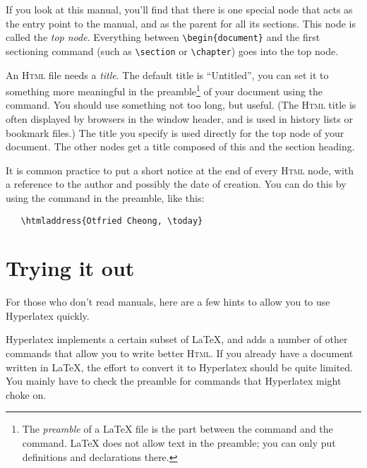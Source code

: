 \documentclass{article}
\newcommand{\+}{\verb+}
\renewcommand{\*}{\back{}}
\newcommand{\Html}{\textsc{Html}\xspace }
\newcommand{\latex}{\LaTeX\xspace }
\begin{document}
\label{topnode}
If you look at \texonly{the \Html output for} this manual, you'll find
that there is one special node that acts as the entry point to the
manual, and as the parent for all its sections. This node is called
the \emph{top node}.  Everything between \+\begin{document}+ and the
  first sectioning command (such as \+\section+ or \+\chapter+) goes
  into the top node.
  
\label{htmltitle}
\label{preamble}
An \Html file needs a \emph{title}. The default title is ``Untitled'',
you can set it to something more meaningful in the
preamble\footnote{\label{footnote-preamble}The \emph{preamble} of a
  \latex file is the part between the 
  command and the  command.  \latex
  does not allow text in the preamble; you can only put definitions
  and declarations there.} of your document using the
 command. You should use something not too
long, but useful. (The \Html title is often displayed by browsers in
the window header, and is used in history lists or bookmark files.)
The title you specify is used directly for the top node of your
document. The other nodes get a title composed of this and the section
heading.

\label{htmladdress}
 It is common practice
to put a short notice at the end of every \Html node, with a reference
to the author and possibly the date of creation. You can do this by
using the  command in the preamble, like
this:
\begin{verbatim}
   \htmladdress{Otfried Cheong, \today}
\end{verbatim}

\section{Trying it out}
\label{sec:trying-it-out}

For those who don't read manuals, here are a few hints to allow you
to use Hyperlatex quickly. 

Hyperlatex implements a certain subset of \latex, and adds a number of
other commands that allow you to write better \Html. If you already
have a document written in \latex, the effort to convert it to
Hyperlatex should be quite limited. You mainly have to check the
preamble for commands that Hyperlatex might choke on.


\end{document}
\end{document}
